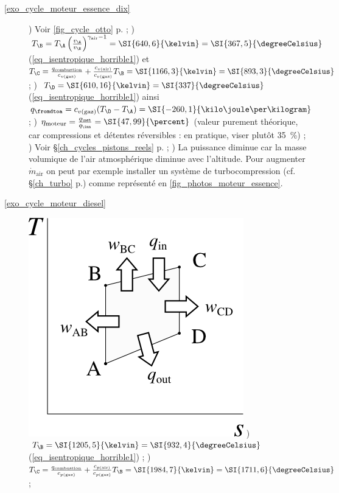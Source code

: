 	\begin{description}
		\item [\ref{exo_cycle_moteur_essence_dix}]
			) Voir \cref{fig_cycle_otto} p.\pageref{fig_cycle_otto} ;
	 		) $T_\B = T_\A \left(\frac{v_\A}{v_\B}\right)^{\gamma_\text{air} - 1} = \SI{640,6}{\kelvin} = \SI{367,5}{\degreeCelsius}$ (\ref{eq_isentropique_horrible1}) et $T_\C = \frac{q_\text{combustion}}{c_{v \text{(gaz)}}} + \frac{c_{v \text{(air)}}}{c_{v \text{(gaz)}}} T_\B = \SI{1166,3}{\kelvin} = \SI{893,3}{\degreeCelsius}$ ;
	 		) $T_\D = \SI{610,16}{\kelvin} = \SI{337}{\degreeCelsius}$ (\ref{eq_isentropique_horrible1}) ainsi $q_\fromdtoa = c_{v \text{(gaz)}} (T_\D - T_\A) = \SI{-260,1}{\kilo\joule\per\kilogram}$ ;
	 		) $\eta_\text{moteur} = \frac{q_\net}{q_\inn} = \SI{47,99}{\percent}$ (valeur purement théorique, car compressions et détentes réversibles : en pratique, viser plutôt \SI{35}{\percent}) ;
	 		) Voir \S\ref{ch_cycles_pistons_reels} p.\pageref{ch_cycles_pistons_reels} ;
	 		) La puissance diminue car la masse volumique de l’air atmosphérique diminue avec l’altitude. Pour augmenter $\dot m_\text{air}$ on peut par exemple installer un système de turbocompression (cf. \S\ref{ch_turbo} p.\pageref{ch_turbo}) comme représenté en \cref{fig_photos_moteur_essence}.
	 	\item [\ref{exo_cycle_moteur_diesel}]
	 		\includegraphics[width=\solutiondiagramwidth]{images/exo_sol_ts_diesel.png}
	 		) $T_\B = \SI{1205,5}{\kelvin} = \SI{932,4}{\degreeCelsius}$ (\ref{eq_isentropique_horrible1}) ;
	 		) $T_\C = \frac{q_\text{combustion}}{c_{p \text{(gaz)}}} + \frac{c_{p \text{(air)}}}{c_{p \text{(gaz)}}} T_\B = \SI{1984,7}{\kelvin} = \SI{1711,6}{\degreeCelsius}$ ;

\end{description}
